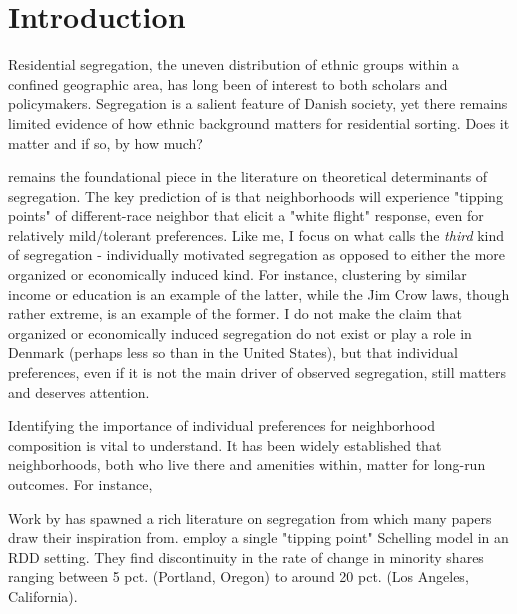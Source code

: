 \documentclass[../main.tex]{subfiles}
\begin{document}
\section{Introduction}

Residential segregation, the uneven distribution of ethnic groups within a confined geographic area, has long been of interest to both scholars and policymakers. Segregation is a salient feature of Danish society, yet there remains limited evidence of how ethnic background matters for residential sorting. Does it matter and if so, by how much?


\textcite{schelling1971dynamic} remains the foundational piece in the literature on theoretical determinants of segregation. The key prediction of \textcite{schelling1971dynamic} is that neighborhoods will experience "tipping points" of different-race neighbor that elicit a "white flight" response, even for relatively mild/tolerant preferences. Like me, I focus on what \textcite{schelling1971dynamic} calls the \textit{third} kind of segregation - individually motivated segregation as opposed to either the more organized or economically induced kind. For instance, clustering by similar income or education is an example of the latter, while the Jim Crow laws, though rather extreme, is an example of the former. I do not make the claim that organized or economically induced segregation do not exist or play a role in Denmark (perhaps less so than in the United States), but that individual preferences, even if it is not the main driver of observed segregation, still matters and deserves attention. 

Identifying the importance of individual preferences for neighborhood composition is vital to understand. It has been widely established that neighborhoods, both who live there and amenities within, matter for long-run outcomes. For instance, 

Work by \textcite{schelling1971dynamic} has spawned a rich literature on segregation from which many papers draw their inspiration from. \textcite{card2008tipping} employ a single "tipping point" Schelling model in an RDD setting. They find discontinuity in the rate of change in minority shares ranging between 5 pct. (Portland, Oregon) to around 20 pct. (Los Angeles, California).
\end{document}
